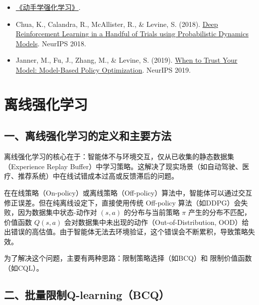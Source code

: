 \begin{itemize}
\tightlist
\item
  \href{https://hrl.boyuai.com/}{《动手学强化学习》}.
\item
  Chua, K., Calandra, R., McAllister, R., \& Levine, S. (2018). \href{https://arxiv.org/abs/1805.12114}{Deep Reinforcement Learning in a Handful of Trials using Probabilistic Dynamics Models}. NeurIPS 2018.
\item
  Janner, M., Fu, J., Zhang, M., \& Levine, S. (2019). \href{https://arxiv.org/abs/1906.08253}{When to Trust Your Model: Model-Based Policy Optimization}. NeurIPS 2019.
\end{itemize}

\clearpage

\hypertarget{ux79bbux7ebfux5f3aux5316ux5b66ux4e60}{%
\section{离线强化学习}\label{ux79bbux7ebfux5f3aux5316ux5b66ux4e60}}

\hypertarget{ux4e00ux79bbux7ebfux5f3aux5316ux5b66ux4e60ux7684ux5b9aux4e49ux548cux4e3bux8981ux65b9ux6cd5}{%
\subsection{一、离线强化学习的定义和主要方法}\label{ux4e00ux79bbux7ebfux5f3aux5316ux5b66ux4e60ux7684ux5b9aux4e49ux548cux4e3bux8981ux65b9ux6cd5}}

离线强化学习的核心在于：智能体不与环境交互，仅从已收集的静态数据集（Experience Replay Buffer）中学习策略。这解决了现实场景（如自动驾驶、医疗、推荐系统）中在线试错成本过高或反馈滞后的问题。

在在线策略（On-policy）或离线策略（Off-policy）算法中，智能体可以通过交互修正误差。但在纯离线设定下，直接使用传统 Off-policy 算法（如DDPG）会失败，因为数据集中状态-动作对 \((s,a)\) 的分布与当前策略 \(\pi\) 产生的分布不匹配，价值函数 \(Q(s,a)\) 会对数据集中未出现的动作（Out-of-Distribution, OOD）给出错误的高估值。由于智能体无法去环境验证，这个错误会不断累积，导致策略失效。

为了解决这个问题，主要有两种思路：限制策略选择（如BCQ）和 限制价值函数（如CQL）。

\hypertarget{ux4e8cux6279ux91cfux9650ux5236q-learningbcq}{%
\subsection{二、批量限制Q-learning（BCQ）}\label{ux4e8cux6279ux91cfux9650ux5236q-learningbcq}}

